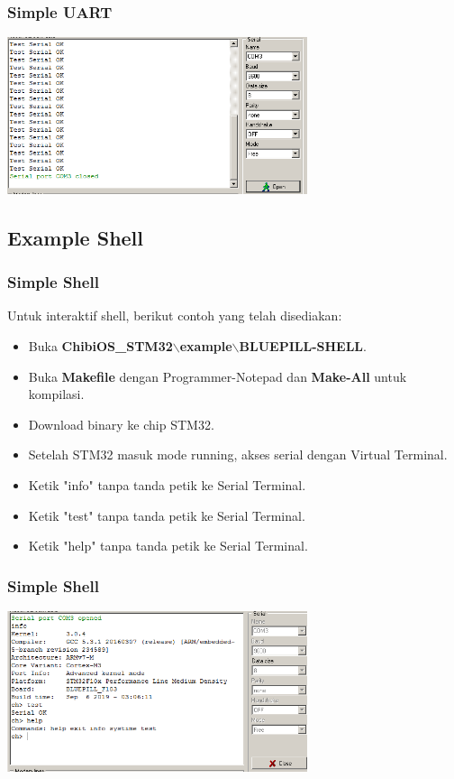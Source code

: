 \documentclass[table,dvipsnames]{beamer}
\begin{document}
	\begin{frame}
		\frametitle{Simple UART}
		\begin{exampleblock}{}
			\begin{center}
				\includegraphics[width=250pt]{images/uart}
			\end{center}
		\end{exampleblock}
	\end{frame}

	\subsection{Example Shell}
	\begin{frame}
		\frametitle{Simple Shell}
		\begin{exampleblock}{}
			Untuk interaktif shell, berikut contoh yang telah disediakan:
			\begin{itemize}
				\item Buka \textbf{ChibiOS\_STM32$\backslash$example$\backslash$BLUEPILL-SHELL}.
				\item Buka \textbf{Makefile} dengan Programmer-Notepad dan \textbf{Make-All} untuk kompilasi.
				\item Download binary ke chip STM32.
				\item Setelah STM32 masuk mode running, akses serial dengan Virtual Terminal.
				\item Ketik "info" tanpa tanda petik ke Serial Terminal.
				\item Ketik "test" tanpa tanda petik ke Serial Terminal.
				\item Ketik "help" tanpa tanda petik ke Serial Terminal.
			\end{itemize}
		\end{exampleblock}
	\end{frame}

	\begin{frame}
		\frametitle{Simple Shell}
		\begin{exampleblock}{}
			\begin{center}
				\includegraphics[width=250pt]{images/shell}
			\end{center}
		\end{exampleblock}
	\end{frame}
\end{document}
